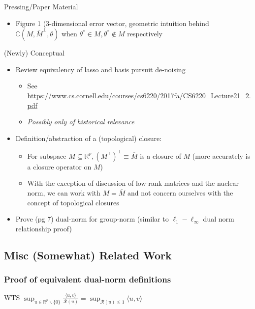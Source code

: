 \documentclass[11pt]{article}
\begin{document}
	Pressing/Paper Material 
	\begin{itemize}	
		\item Figure 1 (3-dimensional error vector, geometric intuition behind $\mathbb{C}(M, \overline{M}^\perp, \theta)$ when $\theta^* \in M, \theta^*\not\in M$ respectively 
	\end{itemize}
	(Newly) Conceptual
	\begin{itemize}
		\item Review equivalency of lasso and basis pursuit de-noising
		\begin{itemize}
			\item See \url{https://www.cs.cornell.edu/courses/cs6220/2017fa/CS6220_Lecture21_2.pdf}
			\item {\it Possibly only of historical relevance}
        \end{itemize}
		\item Definition/abstraction of a (topological) closure:
		\begin{itemize}
			\item For subspace $M \subseteq \mathbb{R}^p, \left(M^\perp \right)^\perp \equiv \overline{M}$ is a closure of $M$ (more accurately is a closure operator on $M$) 
			\item With the exception of discussion of low-rank matrices and the nuclear norm, we can work with $M = \overline{M}$ and not concern ourselves with the concept of topological closures 
        \end{itemize}
		\item Prove (pg 7) dual-norm for group-norm (similar to $\ell_1 - \ell_\infty$ dual norm relationship proof)
	\end{itemize}
	
\subsection*{Misc (Somewhat) Related Work}

\subsubsection{Proof of equivalent dual-norm definitions}

WTS $\sup_{u \in \mathbb{R}^p\backslash\{0\} } \frac{\langle u, v \rangle}{\mathcal{R}(u)} = \sup_{\mathcal{R}(u)\leq 1} \langle u,v \rangle$
\end{document}
